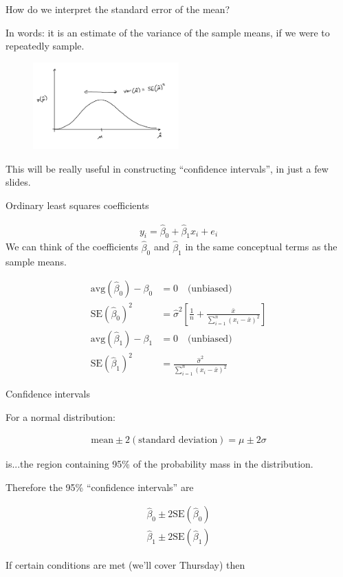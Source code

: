 \documentclass[aspectratio=169]{beamer}
\begin{document}
\begin{frame}{How do we interpret the standard error of the mean?}

In words: it is an estimate of the variance of the sample means, if we were to repeatedly sample.

\pause
\begin{figure}
\includegraphics[width=0.5\textwidth]{sample_mean_dist}
\end{figure}

This will be really useful in constructing ``confidence intervals'', in just a few slides.
\end{frame}


\begin{frame}{Ordinary least squares coefficients}

\begin{align*}
y_i=\hat{\beta}_0+\hat{\beta}_1x_i+e_i
\end{align*}
We can think of the coefficients $\hat{\beta}_0$ and $\hat{\beta}_1$ in the same conceptual terms as the sample means.

\begin{align*}
\text{avg}(\hat{\beta}_0) - \beta_0 &= 0\quad\text{(unbiased)}\\
\text{SE}(\hat{\beta}_0)^2 &= \hat{\sigma}^2 \left[ \frac{1}{n} +
\frac{\bar{x}}{\sum_{i=1}^n (x_i-\bar{x})^2} \right]\\
\text{avg}(\hat{\beta}_{1}) - \beta_1 &= 0\quad\text{(unbiased)}\\
\text{SE}(\hat{\beta}_1)^2& = \frac{\hat{\sigma}^2}{\sum_{i=1}^n (x_i-\bar{x})^2}
\end{align*}

\end{frame}

\begin{frame}{Confidence intervals}

For a normal distribution:

\begin{align*}
\text{mean} \pm 2 (\text{standard deviation}) = \mu \pm 2\sigma
\end{align*}

is...\pause the region containing 95\% of the probability mass in the distribution.  

\vspace{5mm}

Therefore the 95\% ``confidence intervals'' are

\begin{align*}
\hat{\beta}_0 \pm 2\text{SE}(\hat{\beta}_0) \\
\hat{\beta}_1 \pm 2\text{SE}(\hat{\beta}_1) 
\end{align*}

If certain conditions are met (we'll cover Thursday) then 
\end{frame}
\end{document}
